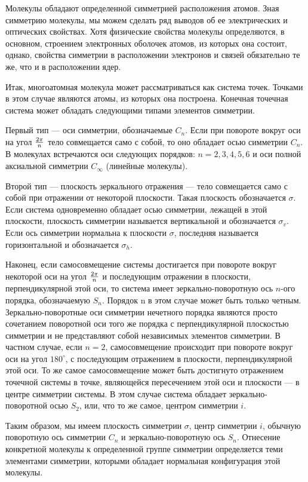  \vskip 2mm
Молекулы обладают определенной симметрией расположения атомов.
Зная симметрию молекулы, мы можем сделать ряд выводов об ее
электрических и оптических свойствах. Хотя физические свойства
молекулы определяются, в основном, строением электронных оболочек
атомов, из которых она состоит, однако, свойства симметрии в
расположении электронов и связей обязательно те же, что и в
расположении ядер.

Итак, многоатомная молекула может рассматриваться как система
точек. Точками в этом случае являются атомы, из которых она
построена. Конечная точечная система может обладать следующими
типами элементов симметрии.

Первый тип --- оси симметрии, обозначаемые $C_n$. Если при
повороте вокруг оси на угол ${2\pi\over n}$ тело совмещается само
с собой, то оно обладает осью симметрии $C_n$. В молекулах
встречаются оси следующих порядков: $n=2,3,4,5,6$ и оси полной
аксиальной симметрии $C_{\infty}$ (линейные молекулы).

Второй тип --- плоскость зеркального отражения --- тело
совмещается само с собой при отражении от некоторой плоскости.
Такая плоскость обозначается $\sigma$. Если система одновременно
обладает осью симметрии, лежащей в этой плоскости, плоскость
симметрии называется вертикальной и обозначается $\sigma_{v}$.
Если ось симметрии нормальна к плоскости $\sigma$, последняя
называется горизонтальной и обозначается $\sigma_h$.

Наконец, если самосовмещение системы достигается при повороте
вокруг некоторой оси на угол ${2\pi\over n}$ и последующим
отражении в плоскости, перпендикулярной этой оси, то система имеет
зеркально-поворотную ось $n$-ого порядка, обозначаемую $S_n$.
Порядок n в этом случае может быть только четным.
Зеркально-поворотные оси симметрии нечетного порядка являются
просто сочетанием поворотной оси того же порядка с
перпендикулярной плоскостью симметрии и не представляют собой
независимых элементов симметрии. В частном случае, если $n=2$,
самосовмещение происходит при повороте вокруг оси на угол
$180^{\circ}$, с последующим отражением в плоскости,
перпендикулярной этой оси. То же самое самосовмещение может быть
достигнуто отражением точечной системы в точке, являющейся
пересечением этой оси и плоскости --- в центре симметрии системы.
В этом случае система обладает зеркально-поворотной осью $S_2$,
или, что то же самое, центром симметрии $i$.

Таким образом, мы имеем плоскость симметрии $\sigma$, центр
симметрии $i$, обычную поворотную ось симметрии $C_n$ и
зеркально-поворотную ось $S_n$. Отнесение конкретной молекулы к
определенной группе симметрии определяется теми элементами
симметрии, которыми обладает нормальная конфигурация этой
молекулы.

